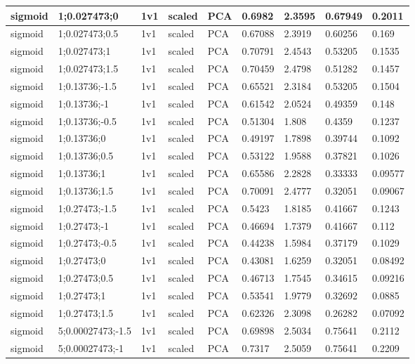 \begin{longtable}{lllllllll}
sigmoid & 1;0.027473;0 & 1v1 & scaled & PCA & 0.6982 & 2.3595 & 0.67949 & 0.2011\\ \hline
sigmoid & 1;0.027473;0.5 & 1v1 & scaled & PCA & 0.67088 & 2.3919 & 0.60256 & 0.169\\ \hline
sigmoid & 1;0.027473;1 & 1v1 & scaled & PCA & 0.70791 & 2.4543 & 0.53205 & 0.1535\\ \hline
sigmoid & 1;0.027473;1.5 & 1v1 & scaled & PCA & 0.70459 & 2.4798 & 0.51282 & 0.1457\\ \hline
sigmoid & 1;0.13736;-1.5 & 1v1 & scaled & PCA & 0.65521 & 2.3184 & 0.53205 & 0.1504\\ \hline
sigmoid & 1;0.13736;-1 & 1v1 & scaled & PCA & 0.61542 & 2.0524 & 0.49359 & 0.148\\ \hline
sigmoid & 1;0.13736;-0.5 & 1v1 & scaled & PCA & 0.51304 & 1.808 & 0.4359 & 0.1237\\ \hline
sigmoid & 1;0.13736;0 & 1v1 & scaled & PCA & 0.49197 & 1.7898 & 0.39744 & 0.1092\\ \hline
sigmoid & 1;0.13736;0.5 & 1v1 & scaled & PCA & 0.53122 & 1.9588 & 0.37821 & 0.1026\\ \hline
sigmoid & 1;0.13736;1 & 1v1 & scaled & PCA & 0.65586 & 2.2828 & 0.33333 & 0.09577\\ \hline
sigmoid & 1;0.13736;1.5 & 1v1 & scaled & PCA & 0.70091 & 2.4777 & 0.32051 & 0.09067\\ \hline
sigmoid & 1;0.27473;-1.5 & 1v1 & scaled & PCA & 0.5423 & 1.8185 & 0.41667 & 0.1243\\ \hline
sigmoid & 1;0.27473;-1 & 1v1 & scaled & PCA & 0.46694 & 1.7379 & 0.41667 & 0.112\\ \hline
sigmoid & 1;0.27473;-0.5 & 1v1 & scaled & PCA & 0.44238 & 1.5984 & 0.37179 & 0.1029\\ \hline
sigmoid & 1;0.27473;0 & 1v1 & scaled & PCA & 0.43081 & 1.6259 & 0.32051 & 0.08492\\ \hline
sigmoid & 1;0.27473;0.5 & 1v1 & scaled & PCA & 0.46713 & 1.7545 & 0.34615 & 0.09216\\ \hline
sigmoid & 1;0.27473;1 & 1v1 & scaled & PCA & 0.53541 & 1.9779 & 0.32692 & 0.0885\\ \hline
sigmoid & 1;0.27473;1.5 & 1v1 & scaled & PCA & 0.62326 & 2.3098 & 0.26282 & 0.07092\\ \hline
sigmoid & 5;0.00027473;-1.5 & 1v1 & scaled & PCA & 0.69898 & 2.5034 & 0.75641 & 0.2112\\ \hline
sigmoid & 5;0.00027473;-1 & 1v1 & scaled & PCA & 0.7317 & 2.5059 & 0.75641 & 0.2209\\ \hline

\end{longtable}
